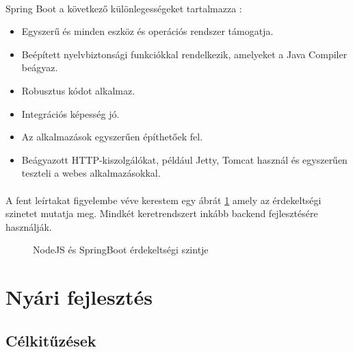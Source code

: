 \documentclass{article}
\begin{document}
	\paragraph{}
	Spring Boot a következő különlegességeket tartalmazza \cite{nodejsspring}:
	\begin{itemize}
		\item Egyszerű és minden eszköz és operációs rendszer támogatja.
		\item Beépített nyelvbiztonsági funkciókkal rendelkezik, amelyeket a Java Compiler beágyaz.
		\item Robusztus kódot alkalmaz.
		\item Integrációs képesség jó.
		\item Az alkalmazások egyszerűen építhetőek fel.
		\item Beágyazott HTTP-kiszolgálókat, például Jetty, Tomcat használ és egyszerűen teszteli a webes alkalmazásokkal.
	\end{itemize}
	
	\paragraph{}
	A fent leírtakat figyelembe véve kerestem egy ábrát \ref{nodespring} amely az érdekeltségi szinetet mutatja meg. \cite{nodejsspring1} Mindkét keretrendszert inkább backend fejlesztésére használják.
	
	\begin{figure}
		\centering
		\caption{NodeJS és SpringBoot érdekeltségi szintje}
		\label{nodespring}
	\end{figure}
	
	\newpage
	\section{Nyári fejlesztés}
	
	\subsection{Célkitűzések}
\end{document}
